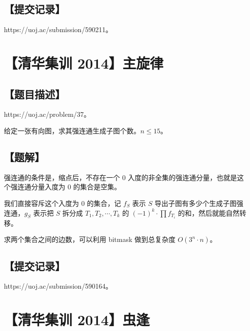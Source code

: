 \documentclass[UTF8,12pt,a4paper]{ctexart}
\begin{document}
	\subsection*{【提交记录】}
	
	https://uoj.ac/submission/590211。
	
	
	
	\section*{【清华集训 2014】主旋律}
	
	\subsection*{【题目描述】}
	
	https://uoj.ac/problem/37。
	
	给定一张有向图，求其强连通生成子图个数。$n\le 15$。
	
	\subsection*{【题解】}
	
	强连通的条件是，缩点后，不存在一个 $0$ 入度的非全集的强连通分量，也就是这个强连通分量入度为 $0$ 的集合是空集。
	
	我们直接容斥这个入度为 $0$ 的集合，记 $f_S$ 表示 $S$ 导出子图有多少个生成子图强连通，$g_S$ 表示把 $S$ 拆分成 $T_1,T_2,\cdots,T_k$ 的 $(-1)^k\cdot \prod f_{T_i}$ 的和，然后就能自然转移。
	
	求两个集合之间的边数，可以利用 bitmask 做到总复杂度 $O(3^n\cdot n)$。
	
	\subsection*{【提交记录】}
	
	https://uoj.ac/submission/590164。
	
	
	\section*{【清华集训 2014】虫逢}
	
\end{document}
